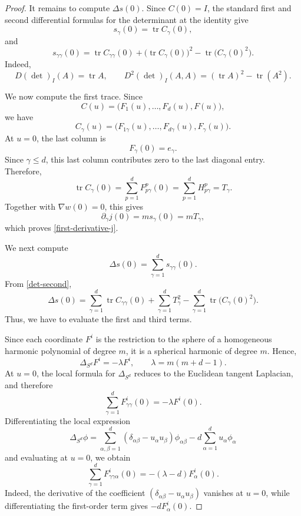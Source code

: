 \documentclass[10pt]{amsart}
\numberwithin{equation}{section}
\theoremstyle{definition}
\DeclareMathOperator{\tr}{tr}
\begin{document}
\begin{proof}
It remains to compute \(\Delta s(0)\). Since \(C(0)=I\), the standard first
and second differential formulas for the determinant at the identity give
\[
        s_\gamma(0)=\tr C_\gamma(0),
\]
and
\begin{equation}\label{det-second}
        s_{\gamma\gamma}(0)
        =
        \tr C_{\gamma\gamma}(0)
        +
        \bigl(\tr C_\gamma(0)\bigr)^2
        -
        \tr\bigl(C_\gamma(0)^2\bigr).
\end{equation}
Indeed,
\[
        D(\det)_I(A)=\tr A,
        \qquad
        D^2(\det)_I(A,A)=(\tr A)^2-\tr(A^2).
\]

We now compute the first trace. Since
\[
        C(u)=\bigl(F_1(u),\ldots,F_d(u),F(u)\bigr),
\]
we have
\[
        C_\gamma(u)=\bigl(F_{1\gamma}(u),\ldots,F_{d\gamma}(u),F_\gamma(u)\bigr).
\]
At \(u=0\), the last column is
\[
        F_\gamma(0)=e_\gamma.
\]
Since \(\gamma\le d\), this last column contributes zero to the last diagonal
entry. Therefore,
\begin{equation}\label{trace-Cgamma}
        \tr C_\gamma(0)
        =
        \sum_{p=1}^{d}F^p_{p\gamma}(0)
        =
        \sum_{p=1}^{d}H^p_{p\gamma}
        =
        T_\gamma.
\end{equation}
Together with \(\nabla w(0)=0\), this gives
\[
        \partial_\gamma j(0)=ms_\gamma(0)=mT_\gamma,
\]
which proves \eqref{first-derivative-j}.

We next compute
\[
        \Delta s(0)=\sum_{\gamma=1}^{d}s_{\gamma\gamma}(0).
\]
From \eqref{det-second},
\[
        \Delta s(0)
        =
        \sum_{\gamma=1}^{d}\tr C_{\gamma\gamma}(0)
        +
        \sum_{\gamma=1}^{d}T_\gamma^2
        -
        \sum_{\gamma=1}^{d}\tr\bigl(C_\gamma(0)^2\bigr).
\]
Thus, we have to evaluate the first and third terms.

Since each coordinate \(F^i\) is the restriction to the sphere of a
homogeneous harmonic polynomial of degree \(m\), it is a spherical harmonic
of degree \(m\). Hence,
\[
        \Delta_{S^d}F^i=-\lambda F^i,
        \qquad
        \lambda=m(m+d-1).
\]
At \(u=0\), the local formula for \(\Delta_{S^d}\) reduces to the Euclidean
tangent Laplacian, and therefore
\begin{equation}\label{second-spherical}
        \sum_{\gamma=1}^{d}F^i_{\gamma\gamma}(0)
        =
        -\lambda F^i(0).
\end{equation}
Differentiating the local expression
\[
        \Delta_{S^d}\phi
        =
        \sum_{\alpha,\beta=1}^{d}
        (\delta_{\alpha\beta}-u_\alpha u_\beta)\phi_{\alpha\beta}
        -
        d\sum_{\alpha=1}^{d}u_\alpha\phi_\alpha
\]
and evaluating at \(u=0\), we obtain
\begin{equation}\label{third-spherical}
        \sum_{\gamma=1}^{d}F^i_{\gamma\gamma\alpha}(0)
        =
        -(\lambda-d)F^i_\alpha(0).
\end{equation}
Indeed, the derivative of the coefficient
\((\delta_{\alpha\beta}-u_\alpha u_\beta)\) vanishes at \(u=0\), while
differentiating the first-order term gives \(-dF^i_\alpha(0)\).


\end{proof}
\end{document}
